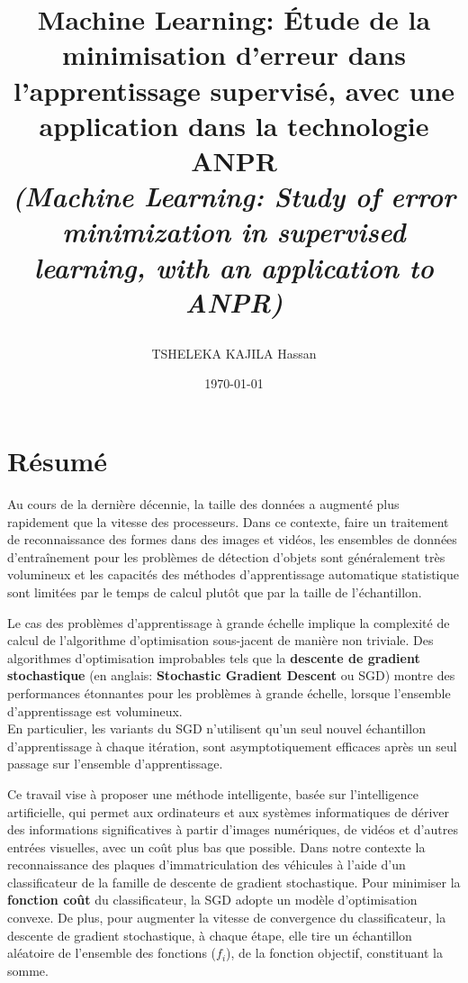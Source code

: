 \documentclass[11pt,a4paper]{report}
\title{\Large{{\bf{Machine Learning: Étude de la minimisation d'erreur dans l'apprentissage supervisé, avec une application dans la technologie ANPR}}\\
\small{\textit{(Machine Learning: Study of error minimization in supervised learning, with an application to ANPR)}}

}
}
\author{TSHELEKA KAJILA Hassan}
\date{\today}
\begin{document}
	
	\renewcommand\thesubsubsection{\Alph{subsubsection}}
	\setcounter{chapter}{-1}
	
	
	\maketitle

	
	
	
	\chapter*{Résumé} 
	
	Au cours de la dernière décennie, la taille des données a augmenté plus rapidement que la vitesse des processeurs. Dans ce contexte, faire un traitement de {reconnaissance} des formes dans des images et vidéos, les ensembles de données d'entraînement pour les problèmes de détection d'objets sont généralement très volumineux et les capacités des méthodes d'apprentissage automatique statistique sont limitées par le temps de calcul plutôt que par la taille de l'échantillon. 
	
	Le cas des problèmes d'apprentissage à grande échelle implique la complexité de calcul de l'algorithme d'optimisation sous-jacent de manière non triviale. Des algorithmes d'optimisation improbables tels que la \textbf{descente de gradient stochastique} (en anglais: \textbf{Stochastic Gradient Descent} ou SGD) montre des performances étonnantes pour les problèmes à grande échelle, lorsque l'ensemble d'apprentissage est volumineux. \\
	En particulier, les variants du SGD n'utilisent qu'un seul nouvel échantillon d'apprentissage à chaque itération, sont asymptotiquement efficaces après un seul passage sur l'ensemble d'apprentissage.	
	
	Ce travail vise à proposer une méthode  intelligente, basée sur l'intelligence artificielle, qui permet aux ordinateurs et aux systèmes informatiques de dériver des informations significatives à partir d'images numériques, de vidéos et d'autres entrées visuelles, avec un coût plus bas que possible. Dans notre contexte la reconnaissance des plaques d’immatriculation des véhicules à l'aide d’un classificateur de la famille de descente de gradient stochastique. Pour minimiser la \textbf{fonction coût} du classificateur, la SGD adopte un modèle d'optimisation convexe. De plus, pour augmenter la vitesse de convergence du classificateur, la descente de gradient stochastique, à chaque étape, elle tire un échantillon aléatoire de l'ensemble des fonctions ($f_i$), de la fonction objectif, constituant la somme.
	
\end{document}

